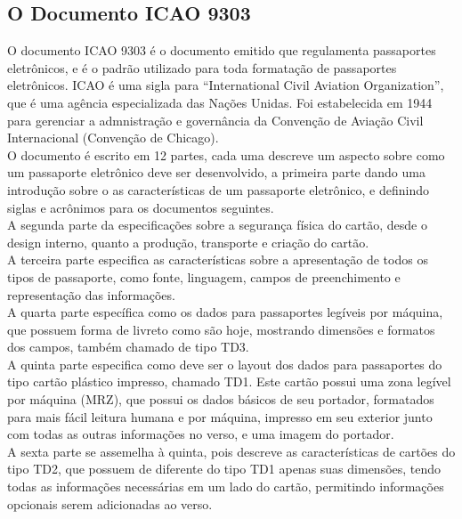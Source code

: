 \documentclass{article}
\begin{document}
	\subsection{O Documento ICAO 9303}
		\begin{justify}
			
				\hspace*{2cm} O documento ICAO 9303 é o documento emitido que regulamenta passaportes eletrônicos, e é o padrão utilizado para toda formatação de passaportes eletrônicos. ICAO é uma sigla para “International Civil Aviation Organization”, que é uma agência especializada das Nações Unidas. Foi estabelecida em 1944 para gerenciar a admnistração e governância da Convenção de Aviação Civil Internacional (Convenção de Chicago). \\
    			\hspace*{2cm} O documento é escrito em 12 partes, cada uma descreve um aspecto sobre como um passaporte eletrônico deve ser desenvolvido, a primeira parte dando uma introdução sobre o as características de um passaporte eletrônico, e definindo siglas e acrônimos para os documentos seguintes.\\
    			\hspace*{2cm} A segunda parte da especificações sobre a segurança física do cartão, desde o design interno, quanto a produção, transporte e criação do cartão. \\
				\hspace*{2cm} A terceira parte especifica as características sobre a apresentação de todos os tipos de passaporte, como fonte, linguagem, campos de preenchimento e representação das informações. \\
				\hspace*{2cm} A quarta parte específica como os dados para passaportes legíveis por máquina, que possuem forma de livreto como são hoje, mostrando dimensões e formatos dos campos, também chamado de tipo TD3. \\
				\hspace*{2cm} A quinta parte especifica como deve ser o layout dos dados para passaportes do tipo cartão plástico impresso, chamado TD1. Este cartão possui uma zona legível por máquina (MRZ), que possui os dados básicos de seu portador, formatados para mais fácil leitura humana e por máquina, impresso em seu exterior junto com todas as outras informações no verso, e uma imagem do portador.\\
				\hspace*{2cm} A sexta parte se assemelha à quinta, pois descreve as características de cartões do tipo TD2, que possuem de diferente do tipo TD1 apenas suas dimensões, tendo todas as informações necessárias em um lado do cartão, permitindo informações opcionais serem adicionadas ao verso.\\

\end{justify}
\end{document}
